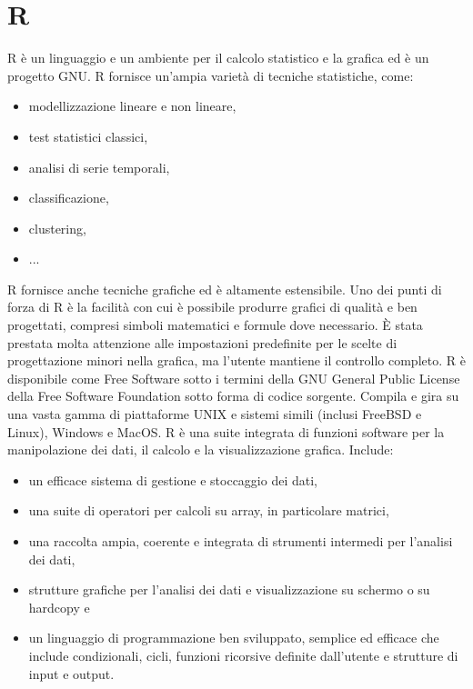 \section{R}
R è un linguaggio e un ambiente per il calcolo statistico e la grafica ed è un progetto GNU. R fornisce un'ampia varietà di tecniche statistiche, come:
\begin{itemize}
\item modellizzazione lineare e non lineare,
\item test statistici classici,
\item analisi di serie temporali,
\item classificazione,
\item clustering,
\item ...
\end{itemize}
R fornisce anche tecniche grafiche ed è altamente estensibile. Uno dei punti di forza di R è la facilità con cui è possibile produrre grafici di qualità e ben progettati, compresi simboli matematici e formule dove necessario. È stata prestata molta attenzione alle impostazioni predefinite per le scelte di progettazione minori nella grafica, ma l'utente mantiene il controllo completo. R è disponibile come Free Software sotto i termini della GNU General Public License della Free Software Foundation sotto forma di codice sorgente. Compila e gira su una vasta gamma di piattaforme UNIX e sistemi simili (inclusi FreeBSD e Linux), Windows e MacOS. R è una suite integrata di funzioni software per la manipolazione dei dati, il calcolo e la visualizzazione grafica. Include:
\begin{itemize}
\item un efficace sistema di gestione e stoccaggio dei dati,
\item una suite di operatori per calcoli su array, in particolare matrici,
\item una raccolta ampia, coerente e integrata di strumenti intermedi per l'analisi dei dati,
\item strutture grafiche per l'analisi dei dati e visualizzazione su schermo o su hardcopy e
\item un linguaggio di programmazione ben sviluppato, semplice ed efficace che include condizionali, cicli, funzioni ricorsive definite dall'utente e strutture di input e output. 
\end{itemize}
